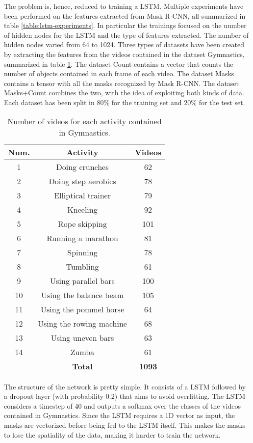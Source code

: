\documentclass[12pt]{article}
\numberwithin{equation}{section} %
\numberwithin{figure}{section} %
\numberwithin{table}{section} %
\theoremstyle{definition}
\begin{document}
The problem is, hence, reduced to training a LSTM. Multiple
experiments have been performed on the features extracted
from Mask R-CNN, all summarized in table
\ref{table:lstm-experiments}. In particular the trainings
focused on the number of hidden nodes for the LSTM and the
type of features extracted. The number of hidden nodes
varied from 64 to 1024. Three types of datasets have
been created by extracting the features from the videos
contained in the dataset Gymnastics, summarized in table
\ref{table:activity-dataset}.
The dataset Count contains a vector
that counts the number of objects contained in each frame of
each video. The dataset Masks contains a tensor with all the
masks recognized by Mask R-CNN. The dataset Masks+Count
combines the two, with the idea of exploiting both kinds
of data. Each dataset has been split in 80\% for the training
set and 20\% for the test set.

\begin{table}
	\centering
	\begin{tabular}{*{3}{c}}
		Num. & Activity & Videos \\
		\hline
		1 & Doing crunches & 62 \\
		2 & Doing step aerobics & 78 \\
		3 & Elliptical trainer & 79 \\
		4 & Kneeling & 92 \\
		5 & Rope skipping & 101 \\
		6 & Running a marathon & 81 \\
		7 & Spinning & 78 \\
		8 & Tumbling & 61 \\
		9 & Using parallel bars & 100 \\
		10 & Using the balance beam & 105 \\
		11 & Using the pommel horse & 64 \\
		12 & Using the rowing machine & 68 \\
		13 & Using uneven bars & 63 \\
		14 & Zumba & 61 \\
		\hline
		& \textbf{Total} & \textbf{1093}
	\end{tabular}
	\caption{Number of videos for each activity contained in Gymnastics.}
	\label{table:activity-dataset}
\end{table}

The structure of the network is pretty simple. It consists
of a LSTM followed by a dropout layer (with probability 0.2)
that aims to avoid overfitting. The LSTM considers a timestep
of 40 and outputs a softmax over the classes of the videos
contained in Gymnastics. Since the LSTM requires a 1D vector
as input, the masks are vectorized before being fed to the
LSTM itself. This makes the masks to lose the spatiality
of the data, making it harder to train the network.
\end{document}
